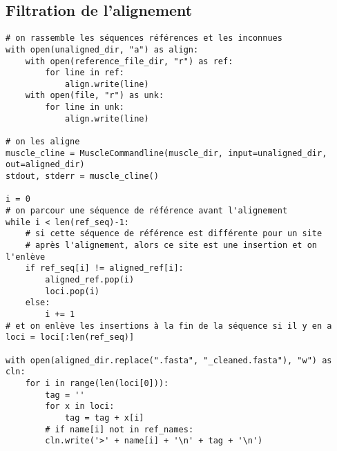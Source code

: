 \subsection{Filtration de l'alignement}
\label{ann:annexeD4}
    \begin{tcolorbox}
        \begin{verbatim}
# on rassemble les séquences références et les inconnues
with open(unaligned_dir, "a") as align:
    with open(reference_file_dir, "r") as ref:
        for line in ref:
            align.write(line)
    with open(file, "r") as unk:
        for line in unk:
            align.write(line)

# on les aligne
muscle_cline = MuscleCommandline(muscle_dir, input=unaligned_dir, out=aligned_dir)
stdout, stderr = muscle_cline()

i = 0
# on parcour une séquence de référence avant l'alignement
while i < len(ref_seq)-1:
    # si cette séquence de référence est différente pour un site 
    # après l'alignement, alors ce site est une insertion et on l'enlève
    if ref_seq[i] != aligned_ref[i]:
        aligned_ref.pop(i)
        loci.pop(i)
    else:
        i += 1
# et on enlève les insertions à la fin de la séquence si il y en a
loci = loci[:len(ref_seq)]

with open(aligned_dir.replace(".fasta", "_cleaned.fasta"), "w") as cln:
    for i in range(len(loci[0])):
        tag = ''
        for x in loci:
            tag = tag + x[i]
        # if name[i] not in ref_names:
        cln.write('>' + name[i] + '\n' + tag + '\n')
        \end{verbatim}
    \end{tcolorbox}
